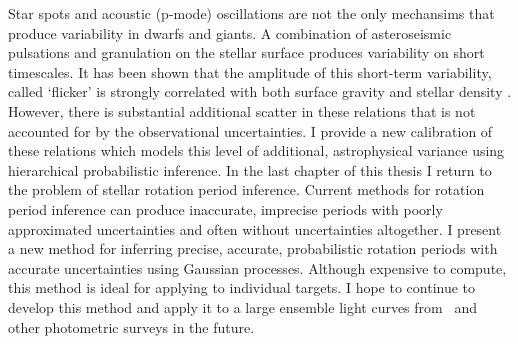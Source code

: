 Star spots and acoustic (p-mode) oscillations are not the only mechansims
that produce variability in dwarfs and giants.
A combination of asteroseismic pulsations and granulation on the stellar
surface produces variability on short timescales.
It has been shown that the amplitude of this short-term variability, called
`flicker' is strongly correlated with both surface gravity and stellar
density \citep{Bastien2013, Bastien2016, Kipping2014}.
However, there is substantial additional scatter in these relations that is
not accounted for by the observational uncertainties.
I provide a new calibration of these relations which models this level of
additional, astrophysical variance using hierarchical probabilistic inference.
In the last chapter of this thesis I return to the problem of stellar rotation
period inference.
Current methods for rotation period inference can produce inaccurate,
imprecise periods with poorly approximated uncertainties and often without
uncertainties altogether.
I present a new method for inferring precise, accurate, probabilistic rotation
periods with accurate uncertainties using Gaussian processes.
Although expensive to compute, this method is ideal for applying to individual
targets.
I hope to continue to develop this method and apply it to a large ensemble
light curves from \kepler\ and other photometric surveys in the future.
